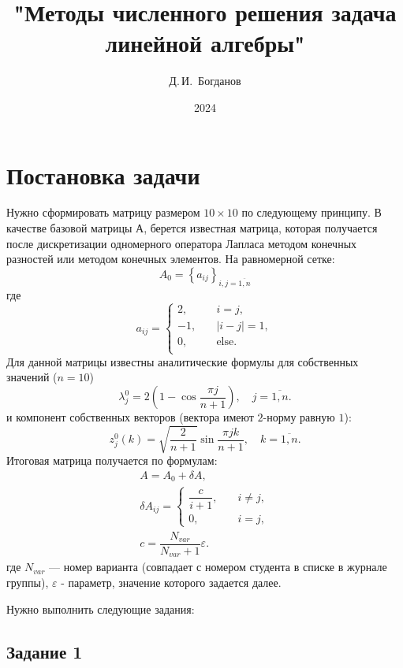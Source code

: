 \documentclass[a4paper,14pt]{extarticle}
\renewcommand{\epsilon}{\varepsilon}
\begin{document}
\title{"Методы численного решения задача линейной алгебры"}
\author{Д.\,И.~Богданов}
\date{2024}
\maketitle


\newpage
\tableofcontents
\newpage


\section{Постановка задачи}


Нужно сформировать матрицу размером $10 \times 10$ по следующему принципу. В качестве базовой матрицы $А$, берется известная матрица, которая получается после дискретизации одномерного оператора Лапласа методом конечных разностей или методом конечных элементов. На равномерной сетке:
\[
A_0 = \left\lbrace a_{ij} \right\rbrace_{i, j = \overline{1, n}}
\]
где
\[
a_{ij} = \begin{cases}
2, \quad &i = j, \\
-1, \quad &|i-j| = 1, \\
0, \quad &\text{else}. \\
\end{cases}
\]
Для данной матрицы известны аналитические формулы для собственных значений ($n = 10$)
\[
\lambda_j^0 =2 (1 - \cos \dfrac{\pi j}{n + 1}),
\quad j = \overline{1, n}.
\]
и компонент собственных векторов (вектора имеют $2$-норму равную $1$):
\[
z_j^0 (k) = \sqrt{\dfrac{2}{n+1}} \sin \dfrac{\pi j k}{n+1},
\quad k = \overline{1, n}.
\]
Итоговая матрица получается по формулам:
\begin{gather*}
A = A_0 + \delta A, \\
\delta A_{ij} = \begin{cases}
\dfrac{c}{i + 1}, \quad &i \neq j, \\
0, \quad &i = j,
\end{cases} \\
c = \dfrac{N_{var}}{N_{var} + 1} \epsilon.
\end{gather*}
где $N_{var}$ --- номер варианта (совпадает с номером студента в списке в журнале
группы), $\epsilon$ - параметр, значение которого задается далее.

Нужно выполнить следующие задания:

\subsection{Задание 1}
\end{document}
